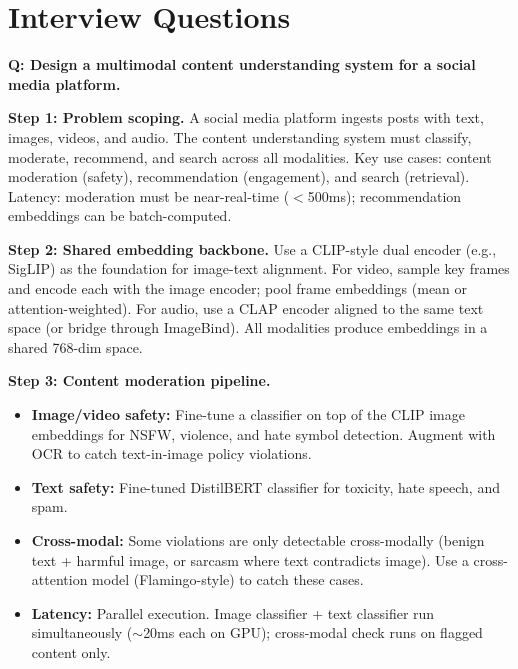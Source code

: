 \section{Interview Questions}
\label{sec:multimodal_interview}


\begin{interviewq}
\textbf{Q: Design a multimodal content understanding system for a social media platform.}

 \quad {} \quad \badgefreq{\freqhigh}

\stronganswer

\textbf{Step 1: Problem scoping.} A social media platform ingests posts with text, images, videos, and audio. The content understanding system must classify, moderate, recommend, and search across all modalities. Key use cases: content moderation (safety), recommendation (engagement), and search (retrieval). Latency: moderation must be near-real-time ($<$500ms); recommendation embeddings can be batch-computed.

\textbf{Step 2: Shared embedding backbone.} Use a CLIP-style dual encoder (e.g., SigLIP) as the foundation for image-text alignment. For video, sample key frames and encode each with the image encoder; pool frame embeddings (mean or attention-weighted). For audio, use a CLAP encoder aligned to the same text space (or bridge through ImageBind). All modalities produce embeddings in a shared 768-dim space.

\textbf{Step 3: Content moderation pipeline.}
\begin{itemize}
    \item \textbf{Image/video safety:} Fine-tune a classifier on top of the CLIP image embeddings for NSFW, violence, and hate symbol detection. Augment with OCR to catch text-in-image policy violations.
    \item \textbf{Text safety:} Fine-tuned DistilBERT classifier for toxicity, hate speech, and spam.
    \item \textbf{Cross-modal:} Some violations are only detectable cross-modally (benign text + harmful image, or sarcasm where text contradicts image). Use a cross-attention model (Flamingo-style) to catch these cases.
    \item \textbf{Latency:} Parallel execution. Image classifier + text classifier run simultaneously ($\sim$20ms each on GPU); cross-modal check runs on flagged content only.
\end{itemize}


\end{interviewq}
